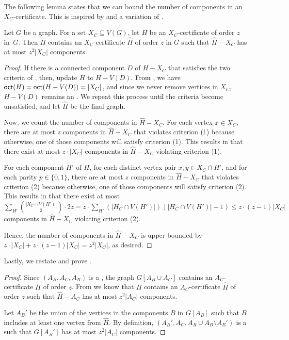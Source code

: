 The following lemma states that we can bound the number of components in an $X_C$-certificate.
This is inspired by and a variation of \cite[Lemma 4.5]{DonkersJ24}.

\begin{lemma}\label{lem:num-components-certificate}
	Let $G$ be a graph. For a set $X_C \subseteq V(G)$, let $H$ be an $X_C$-certificate of order $z$ in~$G$.
  Then $H$ contains an $X_C$-certificate $\hat{H}$ of order $z$ in $G$
	such that $\hat{H}-X_C$ has at most $z^2|X_C|$ components.
\end{lemma}

\begin{proof}
  If there is a connected component $D$ of $H-X_C$ that satisfies the two criteria of ,
  then, update $H$ to $H-V(D)$.
  From , we have $\textnormal{\textsf{oct}}(H) = \textnormal{\textsf{oct}}(H-V(D))=|X_C|$,
  and since we never remove vertices in $X_C$, $H-V(D)$ remains an \zocc.
  We repeat this process until the criteria become unsatisfied,
  and let $\hat{H}$ be the final graph.

  Now, we count the number of components in $\hat{H}-X_C$.
  For each vertex $x \in X_C$, there are at most $z$ components in $\hat{H}-X_C$ that violates criterion (1)
  because otherwise, one of those components will satisfy criterion (1).
  This results in that there exist at most $z \cdot |X_C|$ components in $\hat{H}-X_C$ violating criterion (1).

  For each component $H'$ of $H$, for each distinct vertex pair $x,y \in X_C \cap H'$, 
  and for each parity $p \in \{0,1\}$, there are at most $z$ components in $\hat{H}-X_C$ that violates criterion (2)
  because otherwise, one of those components will satisfy criterion (2).
  This results in that there exist at most
  $\sum_{H'} \binom{|X_C \cap V(H')|}{2} \cdot 2z
  = z \cdot \sum_{H'} (|H_C \cap V(H')|)(|H_C \cap V(H')|-1) \leq z\cdot (z-1)|X_C|$
  components in $\hat{H}-X_C$ violating criterion (2).

  Hence, the number of components in $\hat{H}-X_C$ is upper-bounded by
  $z \cdot |X_C| + z \cdot (z-1) |X_C|=z^2|X_C|$, as desired.
\end{proof}

Lastly, we restate and prove .

\restatenumcomponents*

\begin{proof}
Since $(A_B,A_C,A_R)$ is a \zocc, the graph $G[A_B \cup A_C]$ contains an $A_C$-certificate $H$ of order $z$.
From  we know that $H$ contains an $A_C$-certificate $\hat{H}$
of order $z$ such that $\hat{H}-A_C$ has at most $z^2|A_C|$ components.

Let $A_B'$ be the union of the vertices in the components $B$ in $G[A_B]$ such that
$B$ includes at least one vertex from $\hat{H}$.
By definition, $(A_B',A_C,A_R \cup A_B \setminus A_B')$ is a \zocc such that
$G[A_B']$ has at most $z^2|A_C|$ components.
\end{proof}

